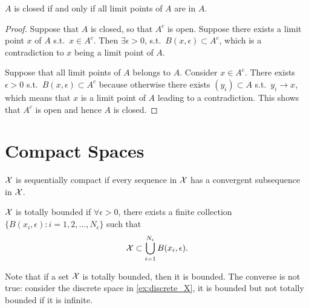 \documentclass[12pt]{article}
\begin{document}
\begin{Lemma}\label{lem:closed}
$A$ is closed if and only if all limit points of $A$ are in $A$.
\end{Lemma}
\begin{proof}
Suppose that $A$ is closed, so that $A^c$ is open. Suppose there exists a limit point $x$ of $A$ s.t.\ $x \in A^c$. Then $\exists \epsilon >0$, s.t.\ $B(x,\epsilon) \subset A^c$, which is a contradiction to $x$ being a limit point of $A$.

Suppose that all limit points of $A$ belongs to $A$. Consider $x\in A^c$. There exists $\epsilon>0$ s.t.\ $B(x,\epsilon)\subset A^c$ because otherwise there exists $(y_i)\subset A$ s.t.\ $y_i\to x$, which means that $x$ is a limit point of $A$ leading to a contradiction. This shows that $A^c$ is open and hence $A$ is closed.
\end{proof}

\section{Compact Spaces}

\begin{Definition}
$\mathcal{X}$ is sequentially compact if every sequence in $\mathcal{X}$ has a convergent subsequence in $\mathcal{X}$.
\end{Definition}

\begin{Definition}
$\mathcal{X}$ is totally bounded if $\forall \epsilon>0$, there exists a finite collection $\{ B(x_i,\epsilon) : i=1,2,\ldots,N_{\epsilon}\}$ such that  
\begin{align*}
\mathcal{X} \subset \bigcup_{i=1}^{N_{\epsilon}}B(x_i,\epsilon).
\end{align*}
\end{Definition}

Note that if a set $\mathcal{X}$ is totally bounded, then it is bounded. The converse is not true: consider the discrete space in \cref{ex:discrete_X}, it is bounded but not totally bounded if it is infinite.
\end{document}

